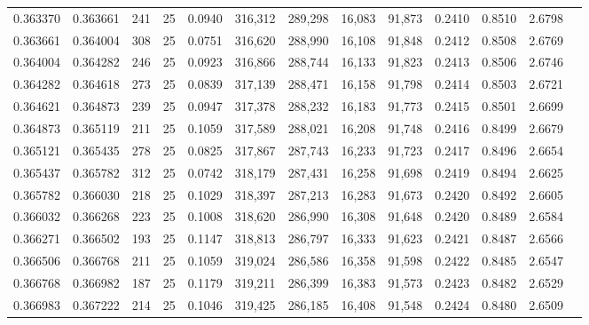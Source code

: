 \begin{tabular}{rrrrrrrrrrrrr}
0.363370 & 0.363661 &   241 &  25 &                                     0.0940 & 316,312 & 289,298 &  16,083 &  91,873 & 0.2410 & 0.8510 & 2.6798 \\
0.363661 & 0.364004 &   308 &  25 &                                     0.0751 & 316,620 & 288,990 &  16,108 &  91,848 & 0.2412 & 0.8508 & 2.6769 \\
0.364004 & 0.364282 &   246 &  25 &                                     0.0923 & 316,866 & 288,744 &  16,133 &  91,823 & 0.2413 & 0.8506 & 2.6746 \\
0.364282 & 0.364618 &   273 &  25 &                                     0.0839 & 317,139 & 288,471 &  16,158 &  91,798 & 0.2414 & 0.8503 & 2.6721 \\
0.364621 & 0.364873 &   239 &  25 &                                     0.0947 & 317,378 & 288,232 &  16,183 &  91,773 & 0.2415 & 0.8501 & 2.6699 \\
0.364873 & 0.365119 &   211 &  25 &                                     0.1059 & 317,589 & 288,021 &  16,208 &  91,748 & 0.2416 & 0.8499 & 2.6679 \\
0.365121 & 0.365435 &   278 &  25 &                                     0.0825 & 317,867 & 287,743 &  16,233 &  91,723 & 0.2417 & 0.8496 & 2.6654 \\
0.365437 & 0.365782 &   312 &  25 &                                     0.0742 & 318,179 & 287,431 &  16,258 &  91,698 & 0.2419 & 0.8494 & 2.6625 \\
0.365782 & 0.366030 &   218 &  25 &                                     0.1029 & 318,397 & 287,213 &  16,283 &  91,673 & 0.2420 & 0.8492 & 2.6605 \\
0.366032 & 0.366268 &   223 &  25 &                                     0.1008 & 318,620 & 286,990 &  16,308 &  91,648 & 0.2420 & 0.8489 & 2.6584 \\
0.366271 & 0.366502 &   193 &  25 &                                     0.1147 & 318,813 & 286,797 &  16,333 &  91,623 & 0.2421 & 0.8487 & 2.6566 \\
0.366506 & 0.366768 &   211 &  25 &                                     0.1059 & 319,024 & 286,586 &  16,358 &  91,598 & 0.2422 & 0.8485 & 2.6547 \\
0.366768 & 0.366982 &   187 &  25 &                                     0.1179 & 319,211 & 286,399 &  16,383 &  91,573 & 0.2423 & 0.8482 & 2.6529 \\
0.366983 & 0.367222 &   214 &  25 &                                     0.1046 & 319,425 & 286,185 &  16,408 &  91,548 & 0.2424 & 0.8480 & 2.6509 \\

\end{tabular}
